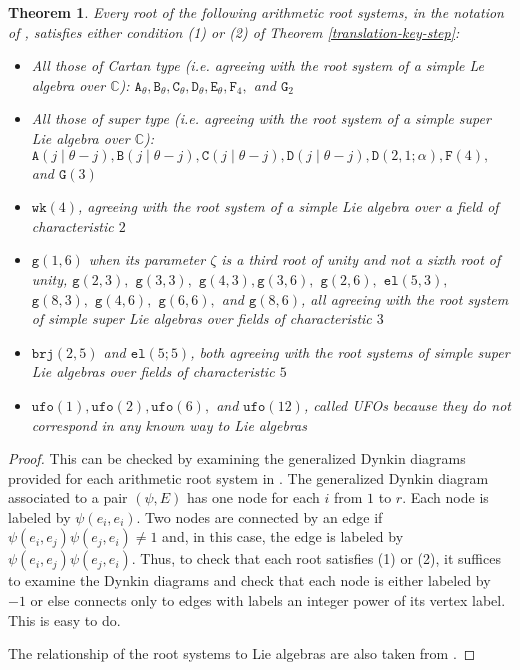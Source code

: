 \documentclass[11pt,letterpaper]{article}
\newtheorem{theorem}{Theorem}[section]
\theoremstyle{definition}
\theoremstyle{remark}
\numberwithin{equation}{section}
\theoremstyle{dotless}
\newcommand{\hchi}{\psi} %
\begin{document}
\begin{theorem} \label{ClassificationTheorem} Every root of the following arithmetic root systems, in the notation of \cite{AndruskiewitschAngiono}, satisfies either condition (1) or (2) of Theorem \ref{translation-key-step}:

\begin{itemize}
    \item All those of Cartan type (i.e. agreeing with the root system of a simple Le algebra over $\mathbb C$): $\mathtt A_\theta,\mathtt   B_\theta, \mathtt C_\theta, \mathtt D_\theta,\mathtt E_\theta,\mathtt  F_4,$ and $\mathtt  G_2$
    \item All those of super type (i.e. agreeing with the root system of a simple super Lie algebra over $\mathbb C$): $\mathtt A(j\mid\theta-j) , \mathtt B(j\mid \theta-j), \mathtt C(j \mid \theta-j), \mathtt D(j \mid \theta-j), \mathtt D(2,1;\alpha) ,\mathtt  F(4),$ and $ \mathtt G(3) $
    \item $\mathtt{wk}(4)$, agreeing with the root system of a simple Lie algebra over a field of characteristic $2$
    \item $\mathtt{g}(1,6)$ when its parameter $\zeta$ is a third root of unity and not a sixth root of unity, $\mathtt{g}(2,3),$ $ \mathtt{g}(3,3),$ $\mathtt{g}(4,3), \mathtt{g}(3,6),$ $ \mathtt{g}(2,6) ,$ $ \mathtt{el}(5,3),$ $ \mathtt{g}(8,3), $ $\mathtt{g}(4,6) ,$ $ \mathtt{g}(6,6), $ and $\mathtt{g}(8,6)$, all agreeing with the root system of simple super Lie algebras over fields of characteristic $3$
    \item $\mathtt{brj}(2,5)$ and $\mathtt{el}(5;5)$, both agreeing with the root systems of simple super Lie algebras over fields of characteristic $5$
    \item $\mathtt{ufo}(1), \mathtt{ufo}(2), \mathtt{ufo}(6) , $ and $ \mathtt{ufo}(12)$, called UFOs because they do not correspond in any known way to Lie algebras 
    \end{itemize}

    \end{theorem}

    \begin{proof} This can be checked by examining the generalized Dynkin diagrams provided for each arithmetic root system in \cite{AndruskiewitschAngiono}. The generalized Dynkin diagram associated to a pair $(\hchi,E)$ has one node for each $i$ from $1$ to $r$. Each node is labeled by $\hchi(e_i,e_i)$. Two nodes are connected by an edge if $\hchi(e_i,e_j) \hchi(e_j,e_i)\neq 1$ and, in this case, the edge is labeled by $\hchi(e_i,e_j) \hchi(e_j,e_i)$. Thus, to check that each root satisfies (1) or (2), it suffices to examine the Dynkin diagrams and check that each node is either labeled by $-1$ or else connects only to edges with labels an integer power of its vertex label.  This is easy to do.

    The relationship of the root systems to Lie algebras are also taken from \cite{AndruskiewitschAngiono}.
    \end{proof}
\end{document}
